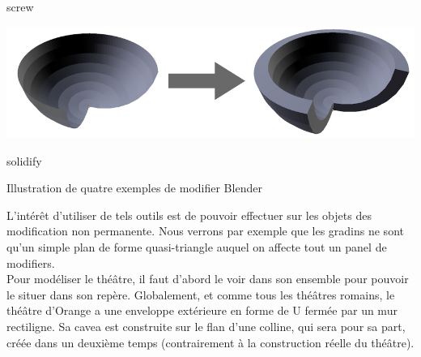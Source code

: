 \begin{figureth}
\begin{subfigureth}{0.45\textwidth}
		\caption{\gls{screw}}
	\end{subfigureth}
	\qquad
	\begin{subfigureth}{0.45\textwidth}
		\includegraphics[width=\linewidth]{images/solidify}
		\caption{\gls{solidify}}
	\end{subfigureth}
\caption{Illustration de quatre exemples de \gls{modifier} Blender}	
\end{figureth}		

L'intérêt d'utiliser de tels outils est de pouvoir effectuer sur les objets des modification non permanente. Nous verrons par exemple que les gradins ne sont qu'un simple plan de forme quasi-triangle auquel on affecte tout un panel de \glspl{modifier}.\\

Pour modéliser le théâtre, il faut d'abord le voir dans son ensemble pour pouvoir le situer dans son repère. Globalement, et comme tous les théâtres romains, le théâtre d'Orange a une enveloppe extérieure en forme de U fermée par un mur rectiligne. Sa \gls{cavea} est construite sur le flan d'une colline, qui sera pour sa part, créée dans un deuxième temps (contrairement à la construction réelle du théâtre). 


